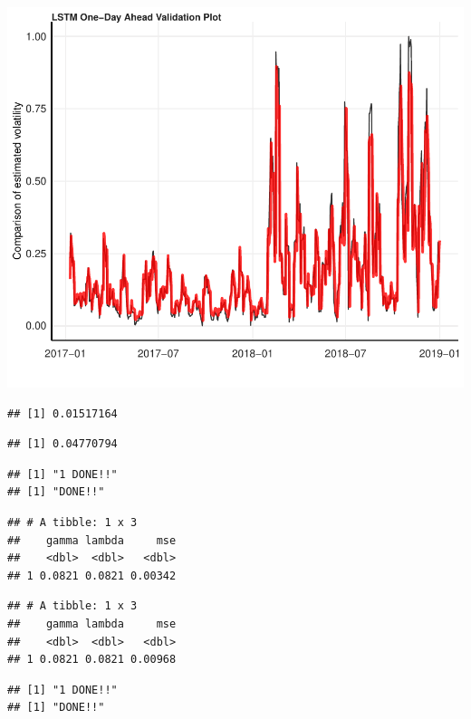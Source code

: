 \documentclass[11pt,preprint, authoryear]{elsarticle}
\let\origfigure\figure
\let\endorigfigure\endfigure
\renewenvironment{figure}[1][2] {
    \expandafter\origfigure\expandafter[H]
} {
    \endorigfigure
}
\numberwithin{equation}{section}
\numberwithin{figure}{section}
\numberwithin{table}{section}
\begin{document}
\begin{figure}[H]

{\centering \includegraphics{Essay_files/figure-latex/plot_val-1} 

}

\caption{LSTM One-Day Ahead Validation Forecast}\label{fig:plot_val}
\end{figure}

\begin{verbatim}
## [1] 0.01517164
\end{verbatim}

\begin{verbatim}
## [1] 0.04770794
\end{verbatim}

\begin{verbatim}
## [1] "1 DONE!!"
## [1] "DONE!!"
\end{verbatim}

\begin{verbatim}
## # A tibble: 1 x 3
##    gamma lambda     mse
##    <dbl>  <dbl>   <dbl>
## 1 0.0821 0.0821 0.00342
\end{verbatim}

\begin{verbatim}
## # A tibble: 1 x 3
##    gamma lambda     mse
##    <dbl>  <dbl>   <dbl>
## 1 0.0821 0.0821 0.00968
\end{verbatim}

\begin{verbatim}
## [1] "1 DONE!!"
## [1] "DONE!!"
\end{verbatim}
\end{document}
